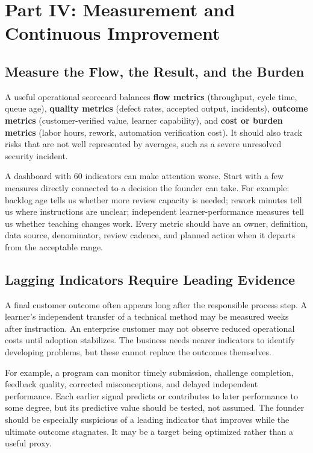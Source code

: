 \section*{Part IV: Measurement and Continuous Improvement}

\subsection{Measure the Flow, the Result, and the Burden}
\label{sec:flow_result_burden}

A useful operational scorecard balances \textbf{flow metrics} (throughput, cycle time, queue age), \textbf{quality metrics} (defect rates, accepted output, incidents), \textbf{outcome metrics} (customer-verified value, learner capability), and \textbf{cost or burden metrics} (labor hours, rework, automation verification cost). It should also track risks that are not well represented by averages, such as a severe unresolved security incident.

A dashboard with 60 indicators can make attention worse. Start with a few measures directly connected to a decision the founder can take. For example: backlog age tells us whether more review capacity is needed; rework minutes tell us where instructions are unclear; independent learner-performance measures tell us whether teaching changes work. Every metric should have an owner, definition, data source, denominator, review cadence, and planned action when it departs from the acceptable range.

\subsection{Lagging Indicators Require Leading Evidence}
\label{sec:lagging_vs_leading}

A final customer outcome often appears long after the responsible process step. A learner's independent transfer of a technical method may be measured weeks after instruction. An enterprise customer may not observe reduced operational costs until adoption stabilizes. The business needs nearer indicators to identify developing problems, but these cannot replace the outcomes themselves.

For example, a program can monitor timely submission, challenge completion, feedback quality, corrected misconceptions, and delayed independent performance. Each earlier signal predicts or contributes to later performance to some degree, but its predictive value should be tested, not assumed. The founder should be especially suspicious of a leading indicator that improves while the ultimate outcome stagnates. It may be a target being optimized rather than a useful proxy.

